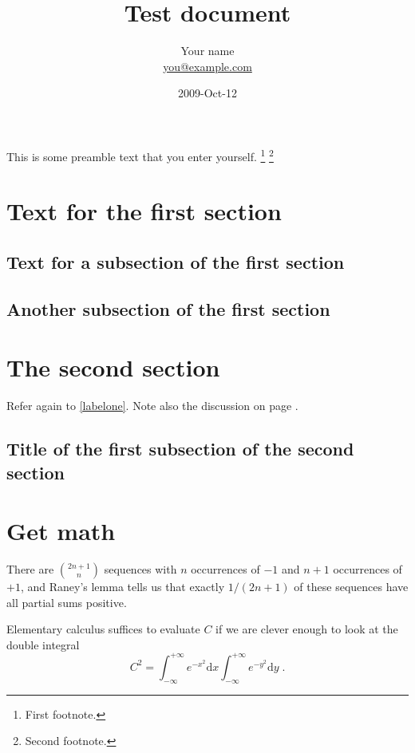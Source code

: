 \documentclass{article}
\title{Test document}
\author{Your name \\ \url{you@example.com}}
\date{2009-Oct-12}
\begin{document}
\maketitle
\tableofcontents
\newpage

This is some preamble text that you enter yourself.
\footnote{First footnote.}
\footnote{Second footnote.}

\section{Text for the first section}
\lipsum[1]

\subsection{Text for a subsection of the first section}
\lipsum[2-3]
\label{labelone}

\subsection{Another subsection of the first section}
\lipsum[4-5]
\label{labeltwo}

\section{The second section}
\lipsum[6]

Refer again to \ref{labelone}.
\cite{ConcreteMath}
Note also the discussion on page \pageref{labeltwo}.

\subsection{Title of the first subsection of the second section}
\lipsum[7]

\section{Get math}
There are $\binom{2n+1}{n}$ sequences with $n$ occurrences of $-1$ and $n+1$
occurrences of $+1$, and Raney's lemma tells us that exactly $1/(2n+1)$ of
these sequences have all partial sums positive.

Elementary calculus suffices to evaluate $C$ if we are clever enough to look
at the double integral
\begin{equation*}
  C^2
  =\int_{-\infty}^{+\infty} e^{-x^2} \mathrm{d}x
  \int_{-\infty}^{+\infty} e^{-y^2} \mathrm{d}y\;.
\end{equation*}
\end{document}
